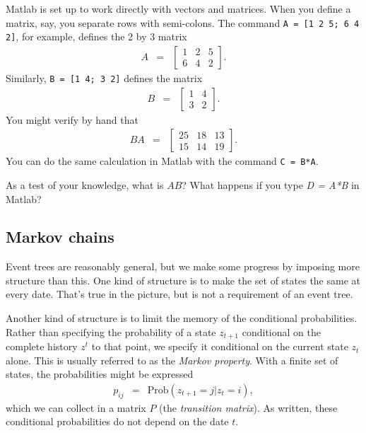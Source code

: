 \documentclass[11pt]{article}
\begin{document}
Matlab is set up to work directly with vectors and matrices.
When you define a matrix, say, you separate rows with semi-colons.
The command {\tt A = [1 2 5; 6 4 2]}, for example,
defines the 2 by 3 matrix
\begin{eqnarray*}
    A &=& \left[
            \begin{array}{ccc}
            1 & 2 & 5 \\ 6 & 4 & 2
            \end{array}
            \right] .
\end{eqnarray*}
Similarly, {\tt B = [1 4; 3 2]} defines the matrix
\begin{eqnarray*}
    B &=& \left[
            \begin{array}{ccc}
            1 & 4 \\  3 & 2
            \end{array}
            \right] .
\end{eqnarray*}
You might verify by hand that
\begin{eqnarray*}
    BA &=& \left[
            \begin{array}{ccc}
            25 & 18 & 13 \\  15 & 14  & 19
            \end{array}
            \right] .
\end{eqnarray*}
You can do the same calculation in Matlab with the command
{\tt C = B*A}.

As a test of your knowledge, what is $A B$?
What happens if you type {\it D = A*B} in Matlab?


\subsection*{Markov chains}

Event trees are reasonably general, but we make some progress by
imposing more structure than this.
One kind of structure is to make the set of states the same at
every date.
That's true in the picture, but is not a requirement of an event tree.


Another kind of structure is to limit the memory of the conditional probabilities.
Rather than specifying the probability of a state $z_{t+1}$
conditional on the complete
history $z^t$ to that point, we specify it conditional on the current state $z_t$ alone.
This is usually referred to as the {\it Markov property\/}.
With a finite set of states,
the probabilities might be expressed
\begin{eqnarray*}
    p_{ij} &=& \mbox{Prob} (z_{t+1} = j | z_t = i) ,
\end{eqnarray*}
which we can collect in a matrix $P$ (the {\it transition matrix\/}).
As written, these conditional probabilities do not depend on
the date $t$.
\end{document}
